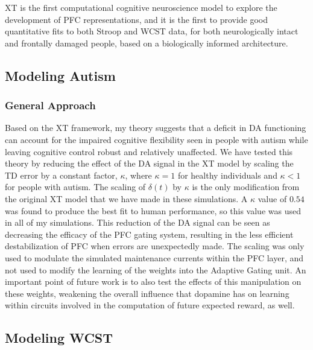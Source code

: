 \documentclass[man]{apa}
\begin{document}
XT is the first computational cognitive neuroscience model to explore
the development of PFC representations, and it is the first to provide
good quantitative fits to both Stroop and WCST data, for both
neurologically intact and frontally damaged people, based on a biologically informed architecture.

\subsection{Modeling Autism}
\subsubsection{General Approach}

Based on the XT framework, my theory suggests that a deficit in DA functioning can account for the impaired cognitive flexibility seen in people with autism while leaving cognitive control robust and relatively unaffected.  We have tested this theory by reducing the effect of the DA signal in the XT model by scaling the TD error by a constant factor, $\kappa$, where $\kappa = 1$ for healthy individuals and $\kappa < 1$ for people with autism.  The scaling of $\delta(t)$ by $\kappa$ is the only modification from the original XT model that we have made in these simulations.  A $\kappa$ value of $0.54$ was found to produce the best fit to human performance, so this value was used in all of my simulations.  This reduction of the DA signal can be seen as decreasing the efficacy of the PFC gating system, resulting in the less efficient destabilization of PFC when errors are unexpectedly made.  The scaling was only used to modulate the simulated maintenance currents within the PFC layer, and not used to modify the learning of the weights into the Adaptive Gating unit.  An important point of future work is to also test the effects of this manipulation on these weights, weakening the overall influence that dopamine has on learning within circuits involved in the computation of future expected reward, as well.  


\subsection{Modeling WCST} 
\end{document}
